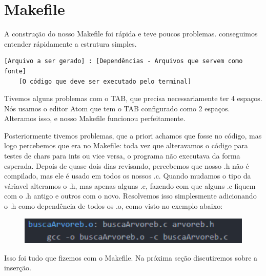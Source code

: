 \section{Makefile}
A construção do nosso Makefile foi rápida e teve poucos problemas. conseguimos entender rápidamente a estrutura simples.
\begin{verbatim}
[Arquivo a ser gerado] : [Dependências - Arquivos que servem como fonte]
    [O código que deve ser executado pelo terminal]
\end{verbatim}
Tivemos alguns problemas com o TAB, que precisa necessariamente ter 4 espaços. Nós usamos o editor Atom que tem o TAB configurado como 2 espaços. Alteramos isso, e nosso Makefile funcionou perfeitamente.
\par Posteriormente tivemos problemas, que a priori achamos que fosse no código, mas logo percebemos que era no Makefile: toda vez que alteravamos o código para testes de chars para ints ou vice versa, o programa não executava da forma esperada. Depois de quase dois dias revisando, percebemos que nosso .h não é compilado, mas ele é usado em todos os nossos .c. Quando mudamos o tipo da váriavel alteramos o .h, mas apenas alguns .c, fazendo com que alguns .c fiquem com o .h antigo e outros com o novo. Resolvemos isso simplesmente adicionando o .h como dependência de todos os .o, como visto no exemplo abaixo:

\begin{figure}[!h]
\centering
\includegraphics[width=5in]{relatorio/imagens/imgMakefile.png}
\end{figure}

\par Isso foi tudo que fizemos com o Makefile. Na próxima seção discutiremos sobre a inserção.